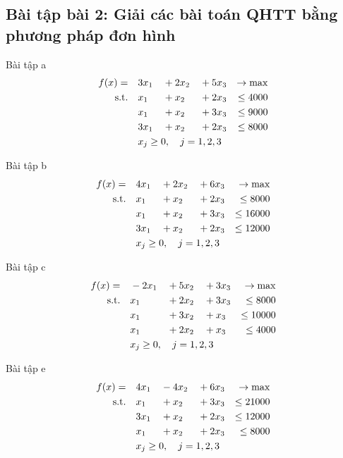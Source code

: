 \subsection{Bài tập bài 2: Giải các bài toán QHTT bằng phương pháp đơn hình}

\begin{exerciseblock}{Bài tập a}
\begin{alignat*}{4}
    f(x) = \quad & 3x_1 & {}+{} & 2x_2 & {}+{} & 5x_3 & \rightarrow \max \\
    \text{s.t.} \quad & x_1 & {}+{} & x_2 & {}+{} & 2x_3 & \le 4000 \\
    & x_1 & {}+{} & x_2 & {}+{} & 3x_3 & \le 9000 \\
    & 3x_1 & {}+{} & x_2 & {}+{} & 2x_3 & \le 8000 \\
    & \rlap{$x_j \ge 0, \quad j = 1,2,3$}
\end{alignat*}
\end{exerciseblock}

\begin{exerciseblock}{Bài tập b}
\begin{alignat*}{4}
    f(x) = \quad & 4x_1 & {}+{} & 2x_2 & {}+{} & 6x_3 & \rightarrow \max \\
    \text{s.t.} \quad & x_1 & {}+{} & x_2 & {}+{} & 2x_3 & \le 8000 \\
    & x_1 & {}+{} & x_2 & {}+{} & 3x_3 & \le 16000 \\
    & 3x_1 & {}+{} & x_2 & {}+{} & 2x_3 & \le 12000 \\
    & \rlap{$x_j \ge 0, \quad j = 1,2,3$}
\end{alignat*}
\end{exerciseblock}

\begin{exerciseblock}{Bài tập c}
\begin{alignat*}{4}
    f(x) = \quad & -2x_1 & {}+{} & 5x_2 & {}+{} & 3x_3 & \rightarrow \max \\
    \text{s.t.} \quad & x_1 & {}+{} & 2x_2 & {}+{} & 3x_3 & \le 8000 \\
    & x_1 & {}+{} & 3x_2 & {}+{} & x_3 & \le 10000 \\
    & x_1 & {}+{} & 2x_2 & {}+{} & x_3 & \le 4000 \\
    & \rlap{$x_j \ge 0, \quad j = 1,2,3$}
\end{alignat*}
\end{exerciseblock}

\begin{exerciseblock}{Bài tập e}
\begin{alignat*}{4}
    f(x) = \quad & 4x_1 & {}-{} & 4x_2 & {}+{} & 6x_3 & \rightarrow \max \\
    \text{s.t.} \quad & x_1 & {}+{} & x_2 & {}+{} & 3x_3 & \le 21000 \\
    & 3x_1 & {}+{} & x_2 & {}+{} & 2x_3 & \le 12000 \\
    & x_1 & {}+{} & x_2 & {}+{} & 2x_3 & \le 8000 \\
    & \rlap{$x_j \ge 0, \quad j = 1,2,3$}
\end{alignat*}
\end{exerciseblock}

